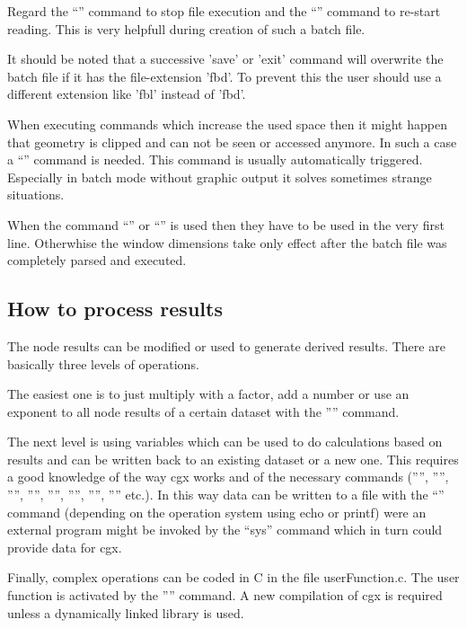 \documentclass{article}
\begin{document}
\begin{appendix}
Regard the ``'' command to stop file execution and the ``'' command to re-start reading. This is very helpfull during creation of such a batch file.

It should be noted that a successive 'save' or 'exit' command will overwrite the batch file if it has the file-extension 'fbd'. To prevent this the user should use a different extension like 'fbl' instead of 'fbd'.

When executing commands which increase the used space then it might happen that geometry is clipped and can not be seen or accessed anymore. In such a case a ``'' command is needed. This command is usually automatically triggered. Especially in batch mode without graphic output it solves sometimes strange situations.

When the command ``'' or ``'' is used then they have to be used in the very first line. Otherwhise the window dimensions take only effect after the batch file was completely parsed and executed.

\subsection{\label{How to process results}How to process results}
The node results can be modified or used to generate derived results. There are basically three levels of operations.

The easiest one is to just multiply with a factor, add a number or use an exponent to all node results of a certain dataset with the '''' command.

The next level is using variables which can be used to do calculations based on results and can be written back to an existing dataset or a new one. This requires a good knowledge of the way cgx works and of the necessary commands ('''', '''', '''', '''', '''', '''', '''', '''' etc.). In this way data can be written to a file with the ``'' command (depending on the operation system using echo or printf) were an external program might be invoked by the ``sys'' command which in turn could provide data for cgx.

Finally, complex operations can be coded in C in the file userFunction.c. The
user function is activated by the '''' command. A new
compilation of cgx is required unless a dynamically linked library is used.


\end{appendix}
\end{document}
